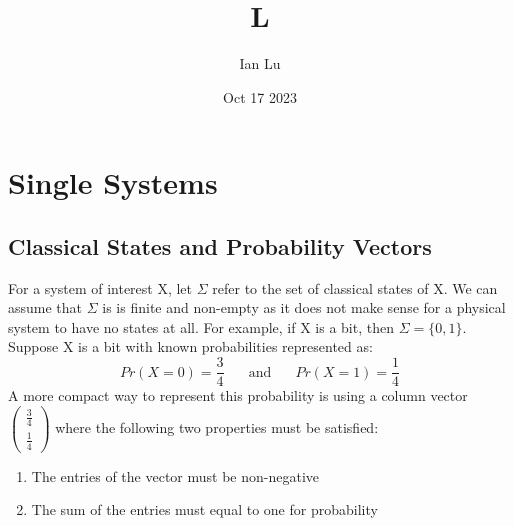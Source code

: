 \documentclass[11pt]{scrartcl}
\title{L}
\author{Ian Lu}
\date{Oct 17 2023}
\begin{document}
\title{}
\section{Single Systems}
\subsection{Classical States and Probability Vectors}
For a system of interest X, let $\Sigma$ refer to the set of classical states of X. We can assume that $\Sigma$ is is finite and non-empty
as it does not make sense for a physical system to have no states at all. 
For example, if X is a bit, then $\Sigma = \{0, 1\}$.
Suppose X is a bit with known probabilities represented as:
$$Pr(X = 0) = \frac{3}{4} \;\;\;\;\;  \text{   and   } \;\;\;\;\; Pr(X = 1) = \frac{1}{4}$$
A more compact way to represent this probability is using a column vector 
$\begin{pmatrix} 
	\frac{3}{4} \\ 
	\frac{1}{4} 
\end{pmatrix}$
where the following two properties must be satisfied:
\begin{enumerate}
	\item The entries of the vector must be non-negative
	\item The sum of the entries must equal to one for probability
\end{enumerate}
\end{document}
